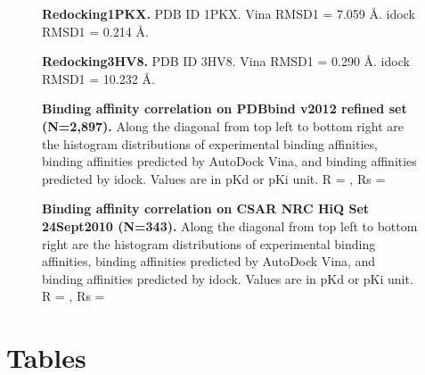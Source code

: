 \documentclass[10pt]{article}
\begin{document}
\begin{figure}[!ht]
\begin{center}
\end{center}
\caption{
{\bf Redocking1PKX.} PDB ID 1PKX. Vina RMSD1 = 7.059 \AA. idock RMSD1 = 0.214 \AA.
}
\label{Redocking1PKX}
\end{figure}

\begin{figure}[!ht]
\begin{center}
\end{center}
\caption{
{\bf Redocking3HV8.} PDB ID 3HV8. Vina RMSD1 = 0.290 \AA. idock RMSD1 = 10.232 \AA.
}
\label{Redocking3HV8}
\end{figure}

\begin{figure}[!ht]
\begin{center}
\end{center}
\caption{
{\bf Binding affinity correlation on PDBbind v2012 refined set (N=2,897).} Along the diagonal from top left to bottom right are the histogram distributions of experimental binding affinities, binding affinities predicted by AutoDock Vina, and binding affinities predicted by idock. Values are in pKd or pKi unit. R = , Rs = 
}
\label{PDBbind2012FECorrelation}
\end{figure}

\begin{figure}[!ht]
\begin{center}
\end{center}
\caption{
{\bf Binding affinity correlation on CSAR NRC HiQ Set 24Sept2010 (N=343).} Along the diagonal from top left to bottom right are the histogram distributions of experimental binding affinities, binding affinities predicted by AutoDock Vina, and binding affinities predicted by idock. Values are in pKd or pKi unit. R = , Rs = 
}
\label{CSARFECorrelation}
\end{figure}

\section*{Tables}
\end{document}

